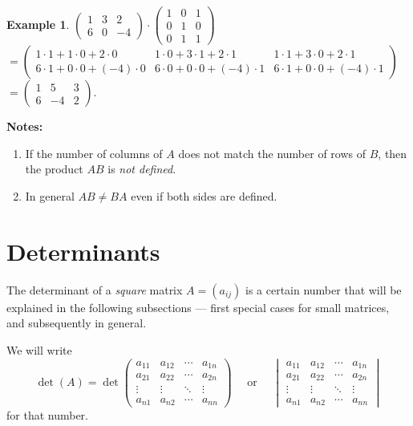 \documentclass[
  12pt,
  oneside]{book}
\theoremstyle{definition}
\theoremstyle{definition}
\newtheorem{example}{Example}[chapter]
\theoremstyle{definition}
\theoremstyle{definition}
\theoremstyle{remark}
\begin{document}
\begin{example}
\protect\hypertarget{exm:unnamed-chunk-43}{}{\label{exm:unnamed-chunk-43} }\(\begin{pmatrix}1 & 3 & 2\\ 6 & 0 & -4\end{pmatrix}\cdot \begin{pmatrix}1 & 0 & 1\\ 0&1&0 \\ 0& 1 & 1\end{pmatrix}\)\\
\(=\begin{pmatrix}1\cdot1+1\cdot0+2\cdot0& 1\cdot0+3\cdot1+2\cdot1&1\cdot1+3\cdot0+2\cdot1\\ 6\cdot1+0\cdot0+(-4)\cdot0 & 6\cdot0+0\cdot0+(-4)\cdot1 & 6\cdot1+0\cdot0+(-4)\cdot1\end{pmatrix}\)\\
\(=\begin{pmatrix}1&5&3\\6&-4&2\end{pmatrix}\).
\end{example}

\textbf{Notes:}

\begin{enumerate}
\def\labelenumi{(\roman{enumi})}
\item
  If the number of columns of \(A\) does not match the number of rows of \(B\), then the product \(AB\) is \emph{not defined}.
\item
  In general \(AB\not=BA\) even if both sides are defined.
\end{enumerate}

\hypertarget{determinants}{%
\section{Determinants}\label{determinants}}

The determinant of a \emph{square} matrix \(A=(a_{ij})\) is a certain number that will be explained in the following subsections --- first special cases for small matrices, and subsequently in general.

We will write
\[
\det(A) = \det
\begin{pmatrix}
    a_{11} & a_{12} & \cdots & a_{1n}\\
    a_{21} & a_{22} & \cdots & a_{2n}\\
    \vdots & \vdots & \ddots & \vdots \\
    a_{n1} & a_{n2} & \cdots & a_{nn}
\end{pmatrix}
\quad\text{ or }\quad
\begin{vmatrix}
    a_{11} & a_{12} & \cdots & a_{1n}\\
    a_{21} & a_{22} & \cdots & a_{2n}\\
    \vdots & \vdots & \ddots & \vdots \\
    a_{n1} & a_{n2} & \cdots & a_{nn}
\end{vmatrix}
\]
for that number.
\end{document}

